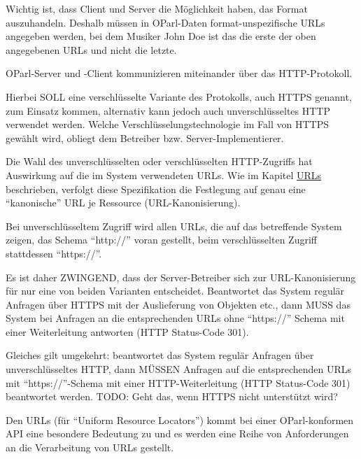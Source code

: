 \documentclass[,a4paper]{article}
\begin{document}
Wichtig ist, dass Client und Server die Möglichkeit haben, das Format
auszuhandeln. Deshalb müssen in OParl-Daten format-unspezifische URLs
angegeben werden, bei dem Musiker John Doe ist das die erste der oben
angegebenen URLs und nicht die letzte.


OParl-Server und -Client kommunizieren miteinander über das
HTTP-Protokoll.

Hierbei SOLL eine verschlüsselte Variante des Protokolls, auch HTTPS
genannt, zum Einsatz kommen, alternativ kann jedoch auch
unverschlüsseltes HTTP verwendet werden. Welche
Verschlüsselungstechnologie im Fall von HTTPS gewählt wird, obliegt dem
Betreiber bzw. Server-Implementierer.

Die Wahl des unverschlüsselten oder verschlüsselten HTTP-Zugriffs hat
Auswirkung auf die im System verwendeten URLs. Wie im Kapitel
\hyperref[urls]{URLs} beschrieben, verfolgt diese Spezifikation die
Festlegung auf genau eine ``kanonische'' URL je Ressource
(URL-Kanonisierung).

Bei unverschlüsseltem Zugriff wird allen URLs, die auf das betreffende
System zeigen, das Schema ``http://'' voran gestellt, beim
verschlüsselten Zugriff stattdessen ``https://''.

Es ist daher ZWINGEND, dass der Server-Betreiber sich zur
URL-Kanonisierung für nur eine von beiden Varianten entscheidet.
Beantwortet das System regulär Anfragen über HTTPS mit der Auslieferung
von Objekten etc., dann MUSS das System bei Anfragen an die
entsprechenden URLs ohne ``https://'' Schema mit einer Weiterleitung
antworten (HTTP Status-Code 301).

Gleiches gilt umgekehrt: beantwortet das System regulär Anfragen über
unverschlüsseltes HTTP, dann MÜSSEN Anfragen auf die entsprechenden URLs
mit ``https://''-Schema mit einer HTTP-Weiterleitung (HTTP Status-Code
301) beantwortet werden. TODO: Geht das, wenn HTTPS nicht unterstützt
wird?


Den URLs (für ``Uniform Resource Locators'') kommt bei einer
OParl-konformen API eine besondere Bedeutung zu und es werden eine Reihe
von Anforderungen an die Verarbeitung von URLs gestellt.
\end{document}
